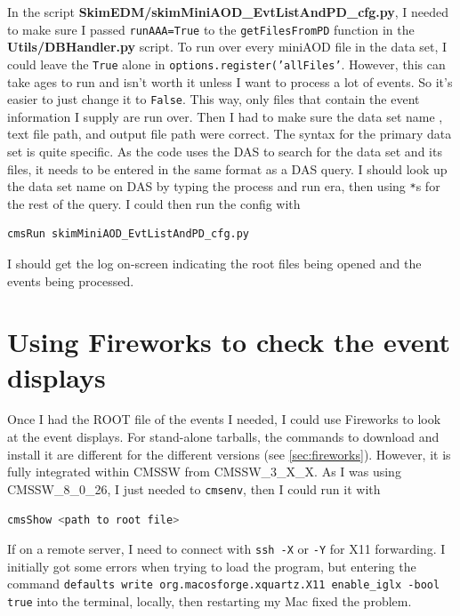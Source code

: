 In the script \textbf{SkimEDM/skimMiniAOD\_EvtListAndPD\_cfg.py}, I needed to make sure I passed \texttt{runAAA=True} to the \texttt{getFilesFromPD} function in the \textbf{Utils/DBHandler.py} script. To run over every miniAOD file in the data set, I could leave the \texttt{True} alone in \texttt{options.register('allFiles'}. However, this can take ages to run and isn't worth it unless I want to process a lot of events. So it's easier to just change it to \texttt{False}. This way, only files that contain the event information I supply are run over. Then I had to make sure the data set name , text file path, and output file path were correct. The syntax for the primary data set is quite specific. As the code uses the DAS to search for the data set and its files, it needs to be entered in the same format as a DAS query. I should look up the data set name on DAS by typing the process and run era, then using \verb!*!s for the rest of the query. I could then run the config with

\begin{lstlisting}[belowskip=-0.7cm, language=sh, numbers=none]
cmsRun skimMiniAOD_EvtListAndPD_cfg.py
\end{lstlisting}

I should get the log on-screen indicating the root files being opened and the events being processed.


\section{Using Fireworks to check the event displays}

Once I had the ROOT file of the events I needed, I could use Fireworks to look at the event displays. For stand-alone tarballs, the commands to download and install it are different for the different versions (see \ref{sec:fireworks}). However, it is fully integrated within CMSSW from CMSSW\_3\_X\_X. As I was using CMSSW\_8\_0\_26, I just needed to \texttt{cmsenv}, then I could run it with

\begin{lstlisting}[belowskip=-0.7cm, language=sh, numbers=none]
cmsShow <path to root file>
\end{lstlisting}

If on a remote server, I need to connect with \texttt{ssh -X} or \texttt{-Y} for X11 forwarding. I initially got some errors when trying to load the program, but entering the command \texttt{defaults write org.macosforge.xquartz.X11 enable\_iglx -bool true} into the terminal, locally, then restarting my Mac fixed the problem.

